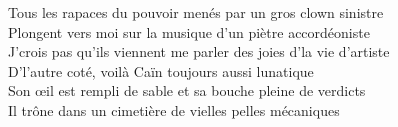 Tous les rapaces du pouvoir menés par un gros clown sinistre \\
Plongent vers moi sur la musique d'un piètre accordéoniste \\
J'crois pas qu'ils viennent me parler des joies d'la vie d'artiste \\

D'l'autre coté, voilà Caïn toujours aussi lunatique \\
Son œil est rempli de sable et sa bouche pleine de verdicts \\
Il trône dans un cimetière de vielles pelles mécaniques \\

